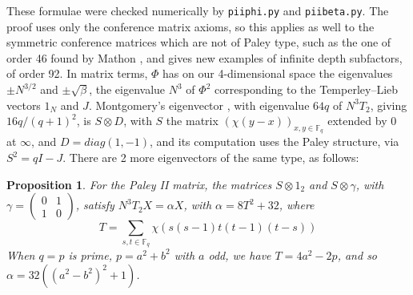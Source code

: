 \documentclass[11pt]{amsart}
\newtheorem{proposition}[theorem]{Proposition}
\begin{document}
These formulae were checked numerically by \texttt{piiphi.py} and \texttt{piibeta.py}. The proof uses only the conference matrix axioms, so this applies as well to the symmetric conference matrices which are not of Paley type, such as the one of order 46 found by Mathon \cite{mat}, and gives new examples of infinite depth subfactors, of order 92. In matrix terms, $\Phi$ has on our 4-dimensional space the eigenvalues $\pm N^{3/2}$ and $\pm\sqrt{\beta}$, the eigenvalue $N^3$ of $\Phi^2$ corresponding to the Temperley--Lieb vectors $1_N$ and $J$. Montgomery's eigenvector \cite{mo1}, with eigenvalue $64q$ of $N^3T_2$, giving $16q/(q+1)^2$, is $S\otimes D$, with $S$ the matrix $(\chi(y-x))_{x,y\in\mathbb F_q}$ extended by 0 at $\infty$, and $D=diag(1,-1)$, and its computation uses the Paley structure, via $S^2=qI-J$. There are 2 more eigenvectors of the same type, as follows:

\begin{proposition}\label{prop:alpha}
For the Paley II matrix, the matrices $S\otimes1_2$ and $S\otimes\gamma$, with $\gamma=\begin{pmatrix}0&1\\1&0\end{pmatrix}$, satisfy $N^3T_2X=\alpha X$, with $\alpha=8T^2+32$, where
$$T=\sum_{s,t\in\mathbb F_q}\chi(s(s-1)t(t-1)(t-s))$$
When $q=p$ is prime, $p=a^2+b^2$ with $a$ odd, we have $T=4a^2-2p$, and so $\alpha=32((a^2-b^2)^2+1)$.
\end{proposition}
\end{document}
